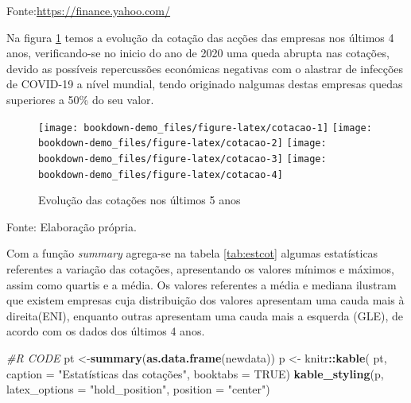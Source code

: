 \documentclass[
  12pt,
  a4paper,
  openany]{book}
\newenvironment{Shaded}{\begin{snugshade}}{\end{snugshade}}
\newcommand{\CommentTok}[1]{\textcolor[rgb]{0.56,0.35,0.01}{\textit{#1}}}
\newcommand{\DataTypeTok}[1]{\textcolor[rgb]{0.13,0.29,0.53}{#1}}
\newcommand{\KeywordTok}[1]{\textcolor[rgb]{0.13,0.29,0.53}{\textbf{#1}}}
\newcommand{\NormalTok}[1]{#1}
\newcommand{\OperatorTok}[1]{\textcolor[rgb]{0.81,0.36,0.00}{\textbf{#1}}}
\newcommand{\OtherTok}[1]{\textcolor[rgb]{0.56,0.35,0.01}{#1}}
\newcommand{\StringTok}[1]{\textcolor[rgb]{0.31,0.60,0.02}{#1}}
\begin{document}
Fonte:\url{https://finance.yahoo.com/}

\justifying
\bigskip

Na figura \ref{fig:cotacao} temos a evolução da cotação das acções das empresas nos últimos 4 anos, verificando-se no inicio do ano de 2020 uma queda abrupta nas cotações, devido as possíveis repercussões económicas negativas com o alastrar de infecções de COVID-19 a nível mundial, tendo originado nalgumas destas empresas quedas superiores a 50\% do seu valor.

\begin{figure}

{\centering \texttt{[image: bookdown-demo\_files/figure-latex/cotacao-1]} \texttt{[image: bookdown-demo\_files/figure-latex/cotacao-2]} \texttt{[image: bookdown-demo\_files/figure-latex/cotacao-3]} \texttt{[image: bookdown-demo\_files/figure-latex/cotacao-4]} 

}

\caption{Evolução das cotações nos últimos 5 anos}\label{fig:cotacao}
\end{figure}
\FloatBarrier
\centering

Fonte: Elaboração própria.

\justifying
\bigskip

Com a função \emph{summary} agrega-se na tabela \ref{tab:estcot} algumas estatísticas referentes a variação das cotações, apresentando os valores mínimos e máximos, assim como quartis e a média. Os valores referentes a média e mediana ilustram que existem empresas cuja distribuição dos valores apresentam uma cauda mais à direita(ENI), enquanto outras apresentam uma cauda mais a esquerda (GLE), de acordo com os dados dos últimos 4 anos.

\scriptsize

\begin{Shaded}
\begin{Highlighting}[]
\CommentTok{\#R CODE}
\NormalTok{pt \textless{}{-}}\KeywordTok{summary}\NormalTok{(}\KeywordTok{as.data.frame}\NormalTok{(newdata))}
\NormalTok{p \textless{}{-}}\StringTok{ }\NormalTok{knitr}\OperatorTok{::}\KeywordTok{kable}\NormalTok{(}
\NormalTok{  pt, }\DataTypeTok{caption =} \StringTok{"Estatísticas das cotações"}\NormalTok{,}
  \DataTypeTok{booktabs =} \OtherTok{TRUE}\NormalTok{)}
\KeywordTok{kable\_styling}\NormalTok{(p, }\DataTypeTok{latex\_options =} \StringTok{"hold\_position"}\NormalTok{, }\DataTypeTok{position =} \StringTok{"center"}\NormalTok{)}
\end{Highlighting}
\end{Shaded}
\end{document}
